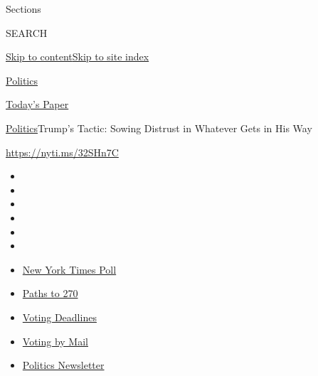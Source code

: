 Sections

SEARCH

\protect\hyperlink{site-content}{Skip to
content}\protect\hyperlink{site-index}{Skip to site index}

\href{https://www.nytimes3xbfgragh.onion/section/politics}{Politics}

\href{https://myaccount.nytimes3xbfgragh.onion/auth/login?response_type=cookie\&client_id=vi}{}

\href{https://www.nytimes3xbfgragh.onion/section/todayspaper}{Today's
Paper}

\href{/section/politics}{Politics}\textbar{}Trump's Tactic: Sowing
Distrust in Whatever Gets in His Way

\url{https://nyti.ms/32SHn7C}

\begin{itemize}
\item
\item
\item
\item
\item
\item
\end{itemize}

\begin{itemize}
\item
  \href{https://www.nytimes3xbfgragh.onion/2020/09/12/us/politics/biden-trump-poll-wisconsin-minnesota.html?action=click\&pgtype=Article\&state=default\&region=TOP_BANNER\&context=storylines_menu}{New
  York Times Poll}
\item
  \href{https://www.nytimes3xbfgragh.onion/interactive/2020/us/elections/election-states-biden-trump.html?action=click\&pgtype=Article\&state=default\&region=TOP_BANNER\&context=storylines_menu}{Paths
  to 270}
\item
  \href{https://www.nytimes3xbfgragh.onion/interactive/2019/us/elections/2020-presidential-election-calendar.html?action=click\&pgtype=Article\&state=default\&region=TOP_BANNER\&context=storylines_menu}{Voting
  Deadlines}
\item
  \href{https://www.nytimes3xbfgragh.onion/interactive/2020/08/31/us/politics/vote-by-mail-deadlines.html?action=click\&pgtype=Article\&state=default\&region=TOP_BANNER\&context=storylines_menu}{Voting
  by Mail}
\item
  \href{https://www.nytimes3xbfgragh.onion/newsletters/politics?action=click\&pgtype=Article\&state=default\&region=TOP_BANNER\&context=storylines_menu}{Politics
  Newsletter}
\end{itemize}


